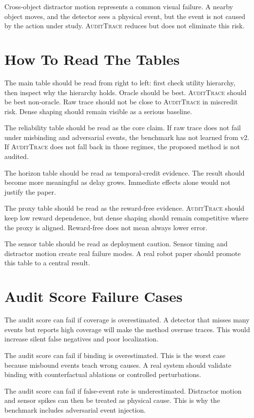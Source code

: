 \documentclass{article}
\newcommand{\method}{\textsc{AuditTrace}\xspace}
\begin{document}
Cross-object distractor motion represents a common visual failure. A nearby object moves, and the detector sees a physical event, but the event is not caused by the action under study. \method reduces but does not eliminate this risk.

\section{How To Read The Tables}

The main table should be read from right to left: first check utility hierarchy, then inspect why the hierarchy holds. Oracle should be best. \method should be best non-oracle. Raw trace should not be close to \method in miscredit risk. Dense shaping should remain visible as a serious baseline.

The reliability table should be read as the core claim. If raw trace does not fail under misbinding and adversarial events, the benchmark has not learned from v2. If \method does not fall back in those regimes, the proposed method is not audited.

The horizon table should be read as temporal-credit evidence. The result should become more meaningful as delay grows. Immediate effects alone would not justify the paper.

The proxy table should be read as the reward-free evidence. \method should keep low reward dependence, but dense shaping should remain competitive where the proxy is aligned. Reward-free does not mean always lower error.

The sensor table should be read as deployment caution. Sensor timing and distractor motion create real failure modes. A real robot paper should promote this table to a central result.

\section{Audit Score Failure Cases}

The audit score can fail if coverage is overestimated. A detector that misses many events but reports high coverage will make the method overuse traces. This would increase silent false negatives and poor localization.

The audit score can fail if binding is overestimated. This is the worst case because misbound events teach wrong causes. A real system should validate binding with counterfactual ablations or controlled perturbations.

The audit score can fail if false-event rate is underestimated. Distractor motion and sensor spikes can then be treated as physical cause. This is why the benchmark includes adversarial event injection.
\end{document}
